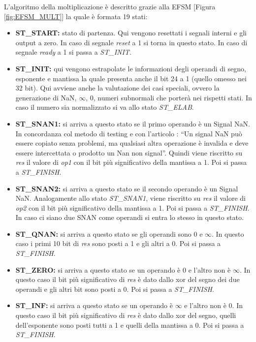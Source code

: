 \documentclass[]{IEEEtran}
\begin{document}
L'algoritmo della moltiplicazione è descritto grazie alla EFSM [Figura \ref{fig:EFSM_MULT}] la quale è formata 19 stati:
\begin{itemize}
    \item \textbf{ST\_START:} stato di partenza. Qui vengono resettati i segnali interni e gli output a zero. In caso di segnale \textit{reset} a 1 si torna in questo stato. In caso di segnale \textit{ready} a 1 si passa a \textit{ST\_INIT}.
    \item \textbf{ST\_INIT:} qui vengono estrapolate le informazioni degli operandi di segno, esponente e mantissa la quale presenta anche il bit 24 a 1 (quello omesso nei 32 bit). Qui avviene anche la valutazione dei casi speciali, ovvero la generazione di NaN, $\infty$, 0, numeri subnormali che porterà nei rispetti stati. In caso il numero sia normalizzato si va allo stato \textit{ST\_ELAB}.
    \item \textbf{ST\_SNAN1:} si arriva a questo stato se il primo operando è un Signal NaN. In concordanza col metodo di testing e con l'articolo \cite{IEEE754Note}: ``Un signal NaN può essere copiato senza problemi, ma qualsiasi altra operazione è invalida e deve essere intercettata o prodotto un Nan non signal''. Quindi viene riscritto su \textit{res} il valore di \textit{op1} con il bit più significativo della mantissa a 1. Poi si passa a \textit{ST\_FINISH}.
    \item \textbf{ST\_SNAN2:} si arriva a questo stato se il secondo operando è un Signal NaN. Analogamente allo stato \textit{ST\_SNAN1}, viene riscritto su \textit{res} il valore di \textit{op2} con il bit più significativo della mantissa a 1. Poi si passa a \textit{ST\_FINISH}. In caso ci siano due SNAN come operandi si entra lo stesso in questo stato.
    \item \textbf{ST\_QNAN:} si arriva a questo stato se gli operandi sono 0 e $\infty$. In questo caso i primi 10 bit di \textit{res} sono posti a 1 e gli altri a 0. Poi si passa a \textit{ST\_FINISH}.
    \item \textbf{ST\_ZERO:} si arriva a questo stato se un operando è 0 e l'altro non è $\infty$. In questo caso il bit più significativo di \textit{res} è dato dallo xor del segno dei due operandi e gli altri bit sono posti a 0. Poi si passa a \textit{ST\_FINISH}.
    \item \textbf{ST\_INF:} si arriva a questo stato se un operando è $\infty$ e l'altro non è 0. In questo caso il bit più significativo di \textit{res} è dato dallo xor del segno, quelli dell'esponente sono posti tutti a 1 e quelli della mantissa a 0. Poi si passa a \textit{ST\_FINISH}.

\end{itemize}
\end{document}

